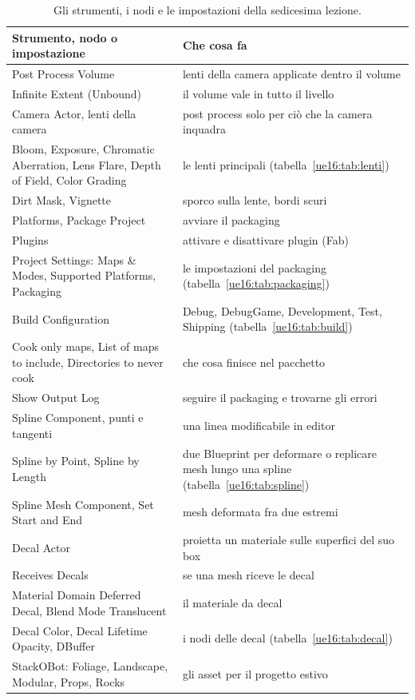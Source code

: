 \begin{table}[htbp]
\centering
\footnotesize
\begin{tabular}{@{}p{5.8cm}p{8.2cm}@{}}
\toprule
\textbf{Strumento, nodo o impostazione} & \textbf{Che cosa fa} \\
\midrule
Post Process Volume & lenti della camera applicate dentro il volume \\
Infinite Extent (Unbound) & il volume vale in tutto il livello \\
Camera Actor, lenti della camera & post process solo per ciò che la camera inquadra \\
Bloom, Exposure, Chromatic Aberration, Lens Flare, Depth of Field, Color Grading & le lenti
principali (tabella~\ref{ue16:tab:lenti}) \\
Dirt Mask, Vignette & sporco sulla lente, bordi scuri \\
Platforms, Package Project & avviare il packaging \\
Plugins & attivare e disattivare plugin (Fab) \\
Project Settings: Maps \& Modes, Supported Platforms, Packaging & le impostazioni del
packaging (tabella~\ref{ue16:tab:packaging}) \\
Build Configuration & Debug, DebugGame, Development, Test, Shipping
(tabella~\ref{ue16:tab:build}) \\
Cook only maps, List of maps to include, Directories to never cook & che cosa finisce nel
pacchetto \\
Show Output Log & seguire il packaging e trovarne gli errori \\
Spline Component, punti e tangenti & una linea modificabile in editor \\
Spline by Point, Spline by Length & due Blueprint per deformare o replicare mesh lungo una
spline (tabella~\ref{ue16:tab:spline}) \\
Spline Mesh Component, Set Start and End & mesh deformata fra due estremi \\
Decal Actor & proietta un materiale sulle superfici del suo box \\
Receives Decals & se una mesh riceve le decal \\
Material Domain Deferred Decal, Blend Mode Translucent & il materiale da decal \\
Decal Color, Decal Lifetime Opacity, DBuffer & i nodi delle decal
(tabella~\ref{ue16:tab:decal}) \\
StackOBot: Foliage, Landscape, Modular, Props, Rocks & gli asset per il progetto estivo \\
\bottomrule
\end{tabular}
\caption{Gli strumenti, i nodi e le impostazioni della sedicesima lezione.}
\label{ue16:tab:strumenti}
\end{table}

